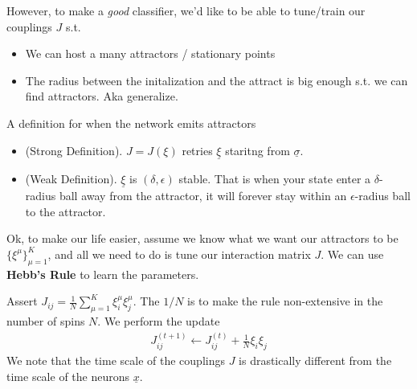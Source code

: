  However, to make a \emph{good} classifier, we'd like to be able to tune/train our couplings $J$  s.t.
\begin{itemize}
	\item We can host a many attractors / stationary points
	\item The radius between the initalization and the attract is big enough s.t. we can find attractors. Aka generalize. 
\end{itemize}
\begin{definition}
	[Retrivial] A definition for when the network emits attractors
	\begin{itemize}
		\item (Strong Definition). $J = J(\xi)$ retries $\underline \xi$ staritng from $\underline \sigma$. 
		\item (Weak Definition). $\underline \xi $ is $(\delta,\epsilon)$ stable. That is when your state enter a $\delta$-radius ball away from the attractor, it will forever stay within an $\epsilon$-radius ball to the attractor.
\end{itemize}
\end{definition}
Ok, to make our life easier, assume we know what we want our attractors to be $\{\xi^\mu\}_{\mu =1}^K$, and all we need to do is tune our interaction matrix $J$. We can use \textbf{Hebb's Rule} to learn the parameters.
\begin{definition}
	 Assert $J_{ij}  = \frac{1}{N}\sum_{\mu=1}^K \xi_i^\mu \xi_j^\mu$. The $1/N$ is to make the rule non-extensive in the number of spins $N$. We perform the update
	\begin{align}
		J^{(t+1)}_{ij} \leftarrow J_{ij}^{(t)} + \frac{1}{N} \xi_i \xi_j
	\end{align}
	We note that the time scale of the couplings $J$ is drastically different from the time scale of the neurons $\underline x$.
\end{definition}

